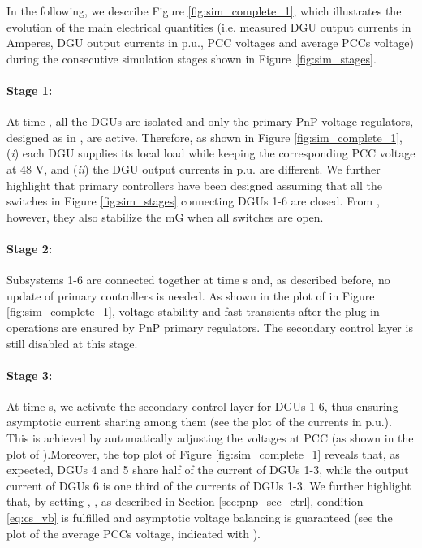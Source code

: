 \documentclass[a4paper]{article}
\theoremstyle{plain}
\begin{document}
In the following, we describe Figure
\ref{fig:sim_complete_1}, which illustrates the evolution of the main
electrical quantities (i.e. measured DGU output currents in Amperes, DGU output currents in p.u., PCC voltages and
average PCCs voltage) during the consecutive simulation
stages shown in Figure~\ref{fig:sim_stages}.

\paragraph{Stage 1:}
At time , all the DGUs are isolated and only
the primary PnP voltage regulators, designed as in \cite{tucci2015decentralized}, are active. Therefore, as shown in
Figure \ref{fig:sim_complete_1}, (\textit{i}) each DGU supplies its local load while keeping the
corresponding PCC voltage at 48 V, and (\textit{ii}) the DGU output currents in p.u.
are different. We further highlight that primary controllers have been designed assuming that all the switches in Figure \ref{fig:sim_stages} connecting DGUs 1-6 are closed. From \cite{tucci2015decentralized}, however, they also stabilize the mG when all switches are open.

\paragraph{Stage 2:}
Subsystems 1-6 are
	connected together at time  s and, as described before, no update of primary controllers is needed. As shown in the plot of  in Figure \ref{fig:sim_complete_1}, voltage stability and fast transients after the plug-in operations are ensured by PnP primary regulators. The secondary control layer is still disabled at this stage.

\paragraph{Stage 3:}
At time  s, we activate the secondary control layer for DGUs 1-6, thus
ensuring asymptotic current sharing among them (see the plot of the currents in p.u.). This is achieved by automatically
adjusting the voltages at PCC (as shown in the plot of ).Moreover, the top plot of Figure \ref{fig:sim_complete_1} reveals that, as expected, DGUs 4 and 5 share half of the current of DGUs 1-3, while the output current of DGUs 6 is one third of the currents of DGUs 1-3. We further highlight that, by setting , , as described in Section \ref{sec:pnp_sec_ctrl}, condition
	\eqref{eq:cs_vb} is fulfilled and asymptotic voltage balancing is guaranteed (see the plot of the average PCCs voltage, indicated with ).
	
\end{document}
